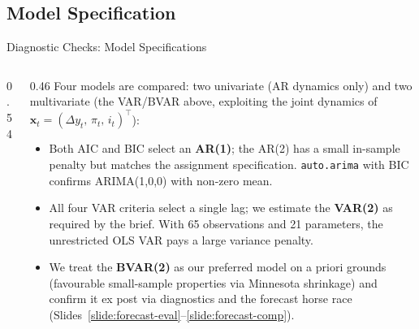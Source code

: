 \documentclass[9pt]{beamer}
\begin{document}
\subsection{Model Specification}
\begin{frame}{Diagnostic Checks: Model Specifications}
\label{slide:models}
\small

\begin{columns}
  \begin{column}{0.54\textwidth}
    {\fontsize{5}{5.5}\selectfont
    \setlength{\tabcolsep}{2.5pt}
    \setlength{\abovecaptionskip}{1pt}
    \setlength{\belowcaptionskip}{1pt}
    
    \vspace{0.1cm}
    
    \vspace{0.1cm}
    
    }
  \end{column}

  \begin{column}{0.46\textwidth}
    \footnotesize
    Four models are compared: two univariate (AR dynamics only) and two multivariate (the VAR/BVAR above, exploiting the joint dynamics of $\mathbf{x}_t=(\Delta y_t,\,\pi_t,\,i_t)^{\!\top}$):
    \begin{itemize}\setlength{\itemsep}{3pt}\setlength{\parskip}{0pt}
      \item Both AIC and BIC select an \textbf{AR(1)}; the AR(2) has a small in-sample penalty but matches the assignment specification. \texttt{auto.arima} with BIC confirms ARIMA(1,0,0) with non-zero mean.

      \item All four VAR criteria select a single lag; we estimate the \textbf{VAR(2)} as required by the brief. With 65 observations and 21 parameters, the unrestricted OLS VAR pays a large variance penalty.

      \item We treat the \textbf{BVAR(2)} as our preferred model on a priori grounds (favourable small-sample properties via Minnesota shrinkage) and confirm it ex post via diagnostics and the forecast horse race (Slides~\ref{slide:forecast-eval}--\ref{slide:forecast-comp}).
    \end{itemize}
  \end{column}
\end{columns}

\end{frame}
\end{document}
